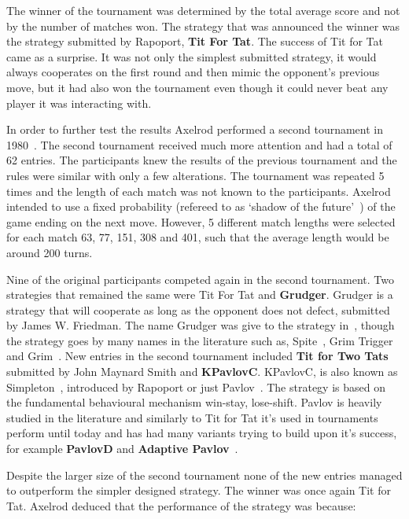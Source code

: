 \documentclass{article}
\theoremstyle{definition}
\begin{document}
The winner of the tournament was determined by the total average score and not
by the number of matches won. The strategy that was announced the winner was the
strategy submitted by Rapoport, \textbf{Tit For Tat}. The success of Tit for Tat
came as a surprise. It was not only the simplest submitted strategy, it would
always cooperates on the first round and then mimic the opponent's previous
move, but it had also won the tournament even though it could never beat
any player it was interacting with.

In order to further test the results Axelrod performed a second tournament
in 1980~\cite{Axelrod1980b}. The second tournament received much more attention
and had a total of 62 entries. The participants knew the results of the previous
tournament and the rules were similar with only a few alterations. The
tournament was repeated 5 times and the length of each match was not known to
the participants. Axelrod intended to use a fixed probability (refereed to as
`shadow of the future'~\cite{Axelrod1988}) of the game ending on the next move.
However, 5 different match lengths were selected for each match 63, 77, 151,
308 and 401, such that the average length would be around 200 turns.

Nine of the original participants competed again in the second tournament. Two
strategies that remained the same were Tit For Tat and \textbf{Grudger}. Grudger
is a strategy that will cooperate as long as the opponent does not defect,
submitted by James W. Friedman. The name Grudger was give to the strategy
in~\cite{Li2014}, though the strategy goes by many names in the literature such
as, Spite~\cite{Beaufils1997}, Grim Trigger~\cite{Banks1990} and
Grim~\cite{Van2015}. New entries in the second tournament included \textbf{Tit
for Two Tats} submitted by John Maynard Smith and \textbf{KPavlovC}. KPavlovC,
is also known as Simpleton~\cite{rapoport1965}, introduced by Rapoport or just
Pavlov~\cite{Nowak1993}. The strategy is based on the fundamental behavioural
mechanism win-stay, lose-shift. Pavlov is heavily studied in the literature and
similarly to Tit for Tat it's used in tournaments perform until today and has
had many variants trying to build upon it's success, for example
\textbf{PavlovD} and \textbf{Adaptive Pavlov}~\cite{Li2007}.

Despite the larger size of the second tournament none of the new entries managed
to outperform the simpler designed strategy. The winner was once again Tit for
Tat. Axelrod deduced that the performance of the strategy was because:
\end{document}
